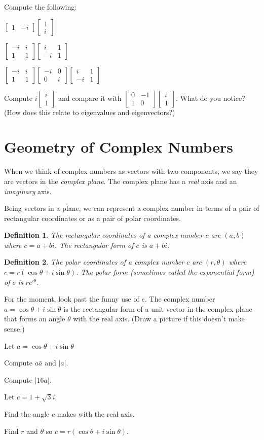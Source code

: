 \documentclass{article}
\newcommand{\mat}[1]{\begin{bmatrix}#1\end{bmatrix}}
\newtheorem{definition}{Definition}
\begin{document}
	Compute the following:
	\begin{Enum}
		\item $\mat{1 &-i}\mat{1\\i}$
		\item $\mat{-i&i\\1&1}\mat{i&1\\-i&1}$
		\item $\mat{-i&i\\1&1}\mat{-i&0\\0&i}\mat{i&1\\-i&1}$
		\item Compute $i\mat{i\\1}$ and compare it
			with $\mat{0&-1\\1&0}\mat{i\\1}$.  What do you notice? (How
			does this relate to eigenvalues and eigenvectors?)
	\end{Enum}

\newpage
\section*{Geometry of Complex Numbers}
	When we think of complex numbers as vectors with two components,
	we say they are vectors in the \emph{complex plane}.  The
	complex plane has a \emph{real} axis and an \emph{imaginary} axis.

	Being vectors in a plane, we can represent a complex number in terms
	of a pair of rectangular coordinates or as a pair of polar coordinates.

	\begin{definition}
		The \emph{rectangular} coordinates of a complex number $c$
		are $(a,b)$ where $c=a+bi$.  The \emph{rectangular form}
		of $c$ is $a+bi$.
	\end{definition}
	
	\begin{definition}
		The \emph{polar} coordinates of a complex number $c$
		are $(r,\theta)$ where $c=r(\cos\theta +i \sin\theta)$.  
		The \emph{polar form} (sometimes
		called the exponential form)
		of $c$ is $re^{i\theta}$.
	\end{definition}

	For the moment, look past the funny use of $e$.  The complex number
	$a=\cos\theta+i\sin\theta$ is the rectangular form of a unit vector in the complex
	plane that forms an angle $\theta$ with the real axis. (Draw a picture
	if this doesn't make sense.)

	Let $a=\cos\theta+i\sin\theta$
	\begin{Enum}
		\item Compute $a\bar a$ and $|a|$.
		\item Compute $|16a|$.
	\end{Enum}
	Let $c=1+\sqrt{3}i$.
	\begin{Enum}[resume]
		\item Find the angle $c$ makes with the real axis.
		\item Find $r$ and $\theta$ so $c=r(\cos\theta+i\sin\theta)$.
	\end{Enum}
\end{document}
